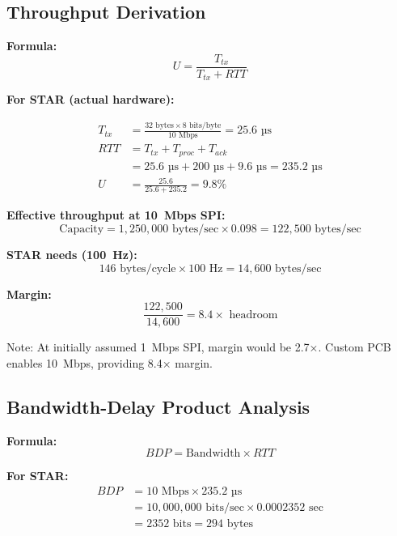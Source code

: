 \subsection{Throughput Derivation}

\textbf{Formula:}
\begin{equation}
U = \frac{T_{tx}}{T_{tx} + RTT}
\end{equation}

\textbf{For STAR (actual hardware):}

\begin{align}
T_{tx} &= \frac{32 \text{ bytes} \times 8 \text{ bits/byte}}{10 \text{ Mbps}} = 25.6 \text{ µs} \\
RTT &= T_{tx} + T_{proc} + T_{ack} \\
    &= 25.6 \text{ µs} + 200 \text{ µs} + 9.6 \text{ µs} = 235.2 \text{ µs} \\
U &= \frac{25.6}{25.6 + 235.2} = 9.8\%
\end{align}

\textbf{Effective throughput at 10~Mbps SPI:}
\begin{equation}
\text{Capacity} = 1,250,000 \text{ bytes/sec} \times 0.098 = 122,500 \text{ bytes/sec}
\end{equation}

\textbf{STAR needs (100~Hz):}
\begin{equation}
146 \text{ bytes/cycle} \times 100 \text{ Hz} = 14,600 \text{ bytes/sec}
\end{equation}

\textbf{Margin:}
\begin{equation}
\frac{122,500}{14,600} = 8.4× \text{ headroom}
\end{equation}

Note: At initially assumed 1~Mbps SPI, margin would be 2.7×. Custom PCB enables 10~Mbps, providing 8.4× margin.

\subsection{Bandwidth-Delay Product Analysis}

\textbf{Formula:}
\begin{equation}
BDP = \text{Bandwidth} \times RTT
\end{equation}

\textbf{For STAR:}
\begin{align}
BDP &= 10 \text{ Mbps} \times 235.2 \text{ µs} \\
    &= 10,000,000 \text{ bits/sec} \times 0.0002352 \text{ sec} \\
    &= 2352 \text{ bits} = 294 \text{ bytes}
\end{align}

